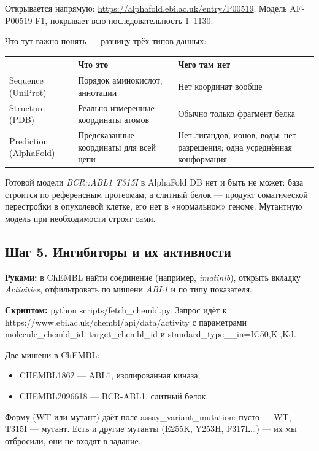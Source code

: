 \documentclass[11pt,a4paper]{article}
\newcommand{\code}[1]{{\ttfamily #1}}
\begin{document}
Открывается напрямую: \url{https://alphafold.ebi.ac.uk/entry/P00519}. Модель
\code{AF-P00519-F1}, покрывает всю последовательность 1--1130.

Что тут важно понять --- разницу трёх типов данных:
\begin{center}
\small
\begin{tabular}{L{3.0cm}L{5.4cm}L{6.2cm}}
\toprule
& \textbf{Что это} & \textbf{Чего там нет} \\
\midrule
Sequence (UniProt) & Порядок аминокислот, аннотации & Нет координат вообще \\
Structure (PDB) & Реально измеренные координаты атомов & Обычно только фрагмент белка \\
Prediction (AlphaFold) & Предсказанные координаты для всей цепи & Нет лигандов, ионов, воды; нет разрешения; одна усреднённая конформация \\
\bottomrule
\end{tabular}
\end{center}

Готовой модели \emph{BCR::ABL1 T315I} в AlphaFold DB нет и быть не может: база
строится по референсным протеомам, а слитный белок --- продукт соматической
перестройки в опухолевой клетке, его нет в «нормальном» геноме. Мутантную модель
при необходимости строят сами.

\subsection{Шаг 5. Ингибиторы и их активности}

\textbf{Руками:} в ChEMBL найти соединение (например, \emph{imatinib}), открыть
вкладку \emph{Activities}, отфильтровать по мишени \emph{ABL1} и по типу
показателя.

\textbf{Скриптом:} \code{python scripts/fetch\_chembl.py}. Запрос идёт к
\code{https://www.ebi.ac.uk/chembl/api/data/activity} с параметрами
\code{molecule\_chembl\_id}, \code{target\_chembl\_id} и
\code{standard\_type\_\_in=IC50,Ki,Kd}.

Две мишени в ChEMBL:
\begin{itemize}[leftmargin=*,topsep=2pt,itemsep=1pt]
\item \code{CHEMBL1862} --- ABL1, изолированная киназа;
\item \code{CHEMBL2096618} --- BCR-ABL1, слитный белок.
\end{itemize}
Форму (WT или мутант) даёт поле \code{assay\_variant\_mutation}: пусто --- WT,
\code{T315I} --- мутант. Есть и другие мутанты (E255K, Y253H, F317L\ldots) ---
их мы отбросили, они не входят в задание.
\end{document}
